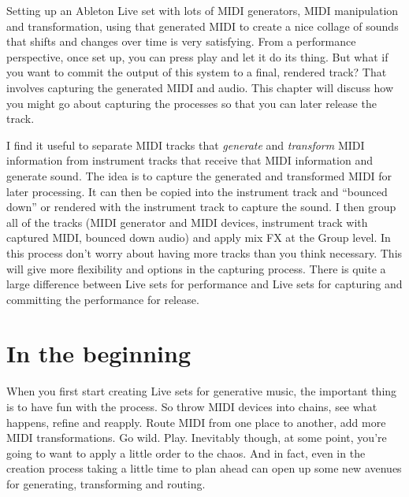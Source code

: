 \documentclass[
  12pt,
  letterpaper,
  oneside,
  open=any]{scrbook}
\begin{document}
Setting up an Ableton Live set with lots of MIDI generators, MIDI
manipulation and transformation, using that generated MIDI to create a
nice collage of sounds that shifts and changes over time is very
satisfying. From a performance perspective, once set up, you can press
play and let it do its thing. But what if you want to commit the output
of this system to a final, rendered track? That involves capturing the
generated MIDI and audio. This chapter will discuss how you might go
about capturing the processes so that you can later release the track.

\begin{tcolorbox}[enhanced jigsaw, breakable, left=2mm, leftrule=.75mm, toprule=.15mm, opacitybacktitle=0.6, toptitle=1mm, coltitle=black, colback=white, colbacktitle=quarto-callout-tip-color!10!white, opacityback=0, rightrule=.15mm, bottomrule=.15mm, titlerule=0mm, title=\textcolor{quarto-callout-tip-color}{\faLightbulb}\hspace{0.5em}{Key idea}, arc=.35mm, bottomtitle=1mm, colframe=quarto-callout-tip-color-frame]

I find it useful to separate MIDI tracks that \emph{generate} and
\emph{transform} MIDI information from instrument tracks that receive
that MIDI information and generate sound. The idea is to capture the
generated and transformed MIDI for later processing. It can then be
copied into the instrument track and ``bounced down'' or rendered with
the instrument track to capture the sound. I then group all of the
tracks (MIDI generator and MIDI devices, instrument track with captured
MIDI, bounced down audio) and apply mix FX at the Group level. In this
process don't worry about having more tracks than you think necessary.
This will give more flexibility and options in the capturing process.
There is quite a large difference between Live sets for performance and
Live sets for capturing and committing the performance for release.

\end{tcolorbox}

\section{In the beginning}\label{in-the-beginning}

When you first start creating Live sets for generative music, the
important thing is to have fun with the process. So throw MIDI devices
into chains, see what happens, refine and reapply. Route MIDI from one
place to another, add more MIDI transformations. Go wild. Play.
Inevitably though, at some point, you're going to want to apply a little
order to the chaos. And in fact, even in the creation process taking a
little time to plan ahead can open up some new avenues for generating,
transforming and routing.
\end{document}
